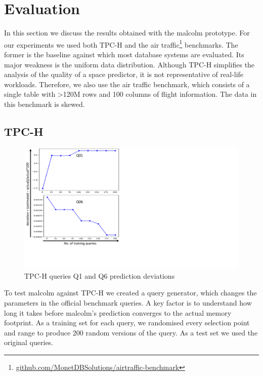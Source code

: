 \documentclass[conference]{IEEEtran}
\begin{document}
\section{Evaluation}
\label{sec:evaluation}
In this section we discuss the results obtained with the {\sc malcolm} prototype.
For our experiments we used both TPC-H and the air traffic\footnote{\url{github.com/MonetDBSolutions/airtraffic-benchmark}} benchmarks.
The former is the baseline against which most database systems are evaluated.
Its major weakness is the uniform data distribution.
Although TPC-H simplifies the analysis of the quality of a space predictor, it is not representative of real-life workloads.
Therefore, we also use the air traffic benchmark, which consists of a single table with \textgreater 120M rows and 100 columns of flight information.
The data in this benchmark is skewed.

\subsection{TPC-H}

\begin{figure}[t!]
	\centering
	\includegraphics[width=0.95\columnwidth]{Figures/tpch-q1-q6.pdf}
	\caption{TPC-H queries Q1 and Q6 prediction deviations
		\label{fig:tpch-q1-q6}}
\end{figure}

To test {\sc malcolm} against TPC-H we created a query generator, which changes the parameters in the official benchmark queries.
A key factor is to understand how long it takes before {\sc malcolm}'s prediction converges to the actual memory footprint.
As a training set for each query, we randomised every selection point and range to produce 200 random versions of the query.
As a test set we used the original queries.
\end{document}
